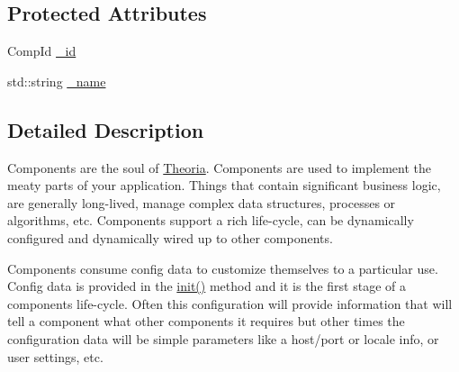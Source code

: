 \subsection*{Protected Attributes}
\begin{DoxyCompactItemize}
\item 
Comp\+Id \hyperlink{classtheoria_1_1core_1_1Component_a460b08de1c87f984fe9b6e4a1b8b50e6}{\+\_\+id}
\item 
std\+::string \hyperlink{classtheoria_1_1core_1_1Component_ac1eca19b044721b873a0ec32cf3667a1}{\+\_\+name}
\end{DoxyCompactItemize}


\subsection{Detailed Description}
Components are the soul of \hyperlink{classtheoria_1_1core_1_1Theoria}{Theoria}. Components are used to implement the meaty parts of your application. Things that contain significant business logic, are generally long-\/lived, manage complex data structures, processes or algorithms, etc. Components support a rich life-\/cycle, can be dynamically configured and dynamically wired up to other components.

Components consume config data to customize themselves to a particular use. Config data is provided in the \hyperlink{classtheoria_1_1core_1_1Component_a7ed45f6e38442a40666ae4556f794f7d}{init()} method and it is the first stage of a components life-\/cycle. Often this configuration will provide information that will tell a component what other components it requires but other times the configuration data will be simple parameters like a host/port or locale info, or user settings, etc.

